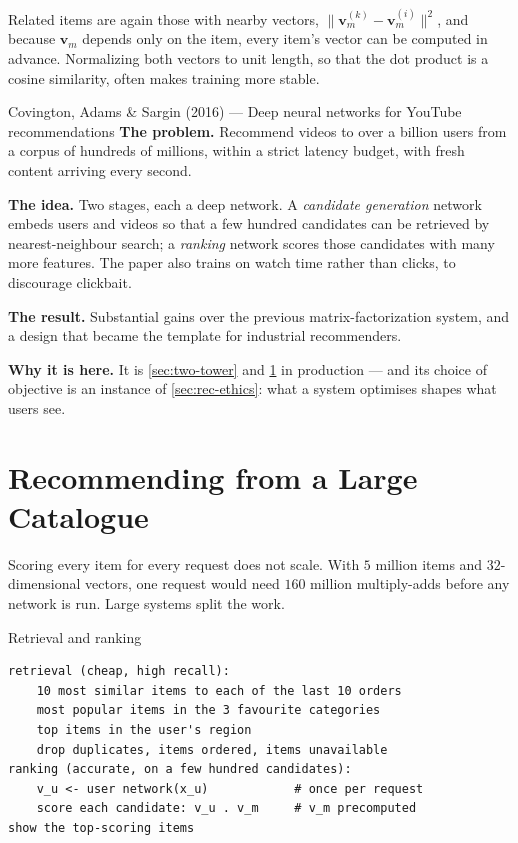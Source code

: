 Related items are again those with nearby vectors, $\|\mathbf{v}_m^{(k)} -
\mathbf{v}_m^{(i)}\|^2$, and because $\mathbf{v}_m$ depends only on the item, every
item's vector can be computed in advance. Normalizing both vectors to unit length,
so that the dot product is a cosine similarity, often makes training more stable.

\begin{researchspotlight}{Covington, Adams \& Sargin (2016) --- Deep neural networks for YouTube recommendations}
\textbf{The problem.} Recommend videos to over a billion users from a corpus of
hundreds of millions, within a strict latency budget, with fresh content
arriving every second.

\textbf{The idea.} Two stages, each a deep network. A \emph{candidate generation}
network embeds users and videos so that a few hundred candidates can be retrieved
by nearest-neighbour search; a \emph{ranking} network scores those candidates with
many more features. The paper also trains on watch time rather than clicks, to
discourage clickbait.

\textbf{The result.} Substantial gains over the previous matrix-factorization
system, and a design that became the template for industrial recommenders.

\textbf{Why it is here.} It is \cref{sec:two-tower} and \cref{sec:large-catalogue}
in production --- and its choice of objective is an instance of
\cref{sec:rec-ethics}: what a system optimises shapes what users see.
\parencite{covington2016}
\end{researchspotlight}

\section{Recommending from a Large Catalogue}
\label{sec:large-catalogue}

Scoring every item for every request does not scale. With $5$ million items and
$32$-dimensional vectors, one request would need $160$ million multiply-adds
before any network is run. Large systems split the work.

\begin{algorithmbox}{Retrieval and ranking}
\begin{lstlisting}[style=pseudocode]
retrieval (cheap, high recall):
    10 most similar items to each of the last 10 orders
    most popular items in the 3 favourite categories
    top items in the user's region
    drop duplicates, items ordered, items unavailable
ranking (accurate, on a few hundred candidates):
    v_u <- user network(x_u)            # once per request
    score each candidate: v_u . v_m     # v_m precomputed
show the top-scoring items
\end{lstlisting}
\end{algorithmbox}


